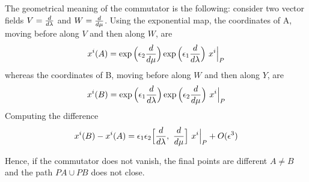    The geometrical meaning of the commutator is the following: consider two vector fields $V = \frac{d}{d\lambda}$ and $W = \frac{d}{d\mu}$. Using the exponential map, the coordinates of A, moving before along $V$ and then along $W$, are 
    \begin{equation*}
        x^i(A) = \exp \Big ( \epsilon_2 \frac{d}{d\mu} \Big) \exp \Big ( \epsilon_1 \frac{d}{d\lambda} \Big) ~ x^i \Big\vert_P
    \end{equation*}
    whereas the coordinates of B, moving before along $W$ and then along $Y$, are 
    \begin{equation*}
        x^i(B) = \exp \Big ( \epsilon_1 \frac{d}{d\lambda} \Big) \exp \Big ( \epsilon_2 \frac{d}{d\mu} \Big) ~ x^i \Big\vert_P
    \end{equation*}
    Computing the difference
    \begin{equation*}
        x^i(B) - x^i(A) = \epsilon_1 \epsilon_2 \Big [\frac{d}{d\lambda}, ~\frac{d}{d\mu} \Big ] ~ x^i \Big\vert_P + O(\epsilon^3)
    \end{equation*}

    Hence, if the commutator does not vanish, the final points are different $A \neq B$ and the path $PA \cup PB$ does not close. 


